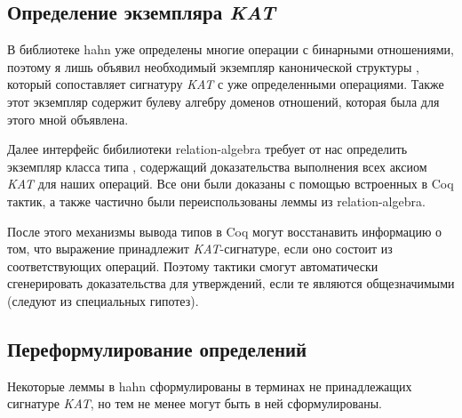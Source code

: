 \documentclass[times
              ]{itmo-student-thesis}
\begin{document}
    \subsection{Определение экземпляра \textit{KAT}}

      В библиотеке hahn уже определены многие операции с бинарными отношениями, поэтому я лишь объявил
      необходимый экземпляр канонической структуры , который сопоставляет сигнатуру
      \textit{KAT} с уже определенными операциями.
      Также этот экземпляр содержит булеву алгебру доменов отношений, которая была для этого мной
      объявлена. 
      
      Далее интерфейс бибилиотеки relation-algebra требует от нас определить экземпляр класса типа
      , содержащий доказательства выполнения всех аксиом \textit{KAT} для наших операций.
      Все они были доказаны с помощью встроенных в Coq тактик, а также частично были переиспользованы
      леммы из relation-algebra.
      
      После этого механизмы вывода типов в Coq могут восстанавить информацию о том, что выражение
      принадлежит \textit{KAT}-сигнатуре, если оно состоит из соответствующих операций.
      Поэтому тактики  смогут автоматически сгенерировать доказательства для
      утверждений, если те являются
      общезначимыми (следуют из специальных гипотез).


    \subsection{Переформулирование определений}

      Некоторые леммы в hahn сформулированы в терминах не принадлежащих сигнатуре \textit{KAT}, но тем не менее
      могут быть в ней сформулированы.
    
\end{document}
